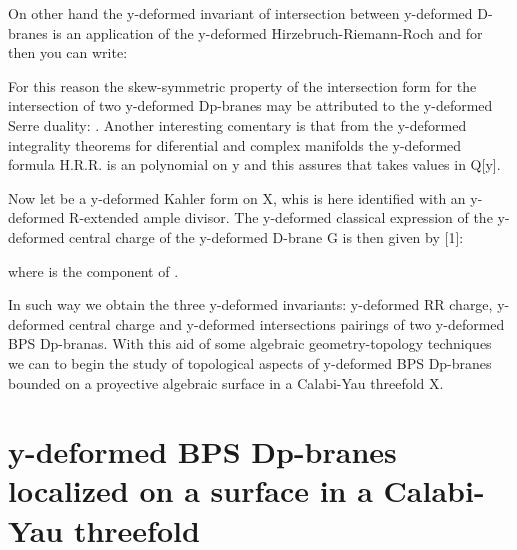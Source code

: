 \documentclass[a4paper,a4paper]{article}
\begin{document}
On other hand the y-deformed invariant of intersection between y-deformed D-branes is an application of the y-deformed Hirzebruch-Riemann-Roch and for then you can write:

 
\begin{center}

{  \coordHE{} }
\end{center}
For this reason the skew-symmetric property \coordHE{} of the intersection form \coordHE{}  for the intersection of two y-deformed Dp-branes may be attributed to the y-deformed Serre duality: \coordHE{}. Another interesting comentary is that from the y-deformed integrality theorems for diferential and complex manifolds the y-deformed formula H.R.R. is an polynomial on y  and this assures that \coordHE{} takes values in Q[y].
 

Now let \coordHE{}  be a y-deformed Kahler form on X, whis is here identified with an y-deformed R-extended ample divisor. The y-deformed classical expression of the y-deformed central charge of the y-deformed D-brane G is then given by [1]:
\begin{center}
{  \coordHE{} }
\end{center}

where \coordHE{} is the \coordHE{} component of \coordHE{}.

In such way we obtain the three y-deformed invariants: y-deformed RR charge,
y-deformed central charge and y-deformed intersections pairings of two y-deformed BPS Dp-branas. With this aid of some algebraic geometry-topology techniques we can to begin the study of topological aspects of y-deformed BPS Dp-branes bounded on a proyective algebraic surface in a Calabi-Yau threefold X. 

\section{y-deformed BPS Dp-branes localized on a surface in a Calabi-Yau
threefold}
\end{document}
